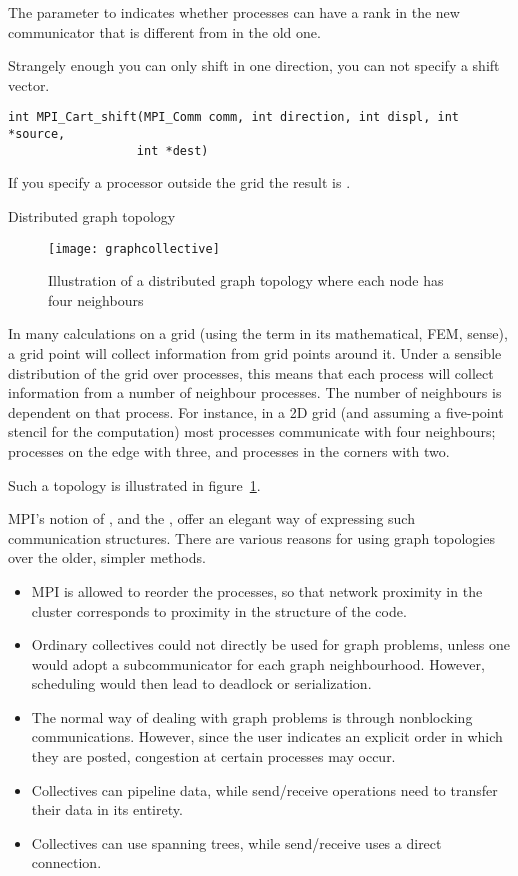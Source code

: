 The  parameter to 
indicates whether processes can have a rank
in the new communicator that is different from in the old one.

Strangely enough you can only shift in one direction, you can not
specify a shift vector.
\begin{lstlisting}
int MPI_Cart_shift(MPI_Comm comm, int direction, int displ, int *source, 
                  int *dest)
\end{lstlisting}
If you specify a processor outside the grid
the result is .


 {Distributed graph topology}
\label{sec:mpi-dist-graph}

\begin{figure}[ht]
  \texttt{[image: graphcollective]}
  \caption{Illustration of a distributed graph topology where each
    node has four neighbours}
  \label{fig:graphcollective}
\end{figure}

In many calculations on a grid (using the term in its mathematical,
\ac{FEM}, sense), a grid point will collect information from grid
points around it. Under a sensible distribution of the grid over
processes, this means that each process will collect information from
a number of neighbour processes. The number of 
neighbours is dependent on that process. For instance, in a 2D
grid (and assuming a five-point stencil for the computation) most
processes communicate with four neighbours; processes on the edge with
three, and processes in the corners with two.

Such a topology is illustrated in figure~\ref{fig:graphcollective}.

MPI's notion of , and the
, offer an elegant way of
expressing such communication structures. There are various reasons
for using graph topologies over the older, simpler methods.
\begin{itemize}
\item MPI is allowed to reorder the processes, so that network proximity
  in the cluster corresponds to proximity in the structure of the
  code.
\item Ordinary collectives could not directly be used for graph
  problems, unless one would adopt a subcommunicator for each graph
  neighbourhood. However, scheduling would then lead to deadlock or
  serialization.
\item The normal way of dealing with graph problems is through
  nonblocking communications. However, since the user indicates an
  explicit order in which they are posted, congestion at certain
  processes may occur.
\item Collectives can pipeline data, while send/receive operations
  need to transfer their data in its entirety.
\item Collectives can use spanning trees, while send/receive uses a
  direct connection.
\end{itemize}


